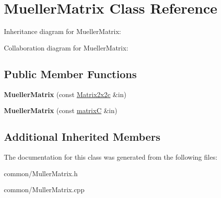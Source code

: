 \hypertarget{class_mueller_matrix}{}\section{Mueller\+Matrix Class Reference}
\label{class_mueller_matrix}


Inheritance diagram for Mueller\+Matrix\+:


Collaboration diagram for Mueller\+Matrix\+:
\subsection*{Public Member Functions}
\begin{DoxyCompactItemize}
\item 
\mbox{\label{class_mueller_matrix_a567e0f446f455f3eec493029c2983dbb}} 
{\bfseries Mueller\+Matrix} (const \mbox{\hyperlink{class_matrix2x2c}{Matrix2x2c}} \&in)
\item 
\mbox{\label{class_mueller_matrix_a13b75f898bb755242ef968cc7a680355}} 
{\bfseries Mueller\+Matrix} (const \mbox{\hyperlink{classmatrix_c}{matrixC}} \&in)
\end{DoxyCompactItemize}
\subsection*{Additional Inherited Members}


The documentation for this class was generated from the following files\+:\begin{DoxyCompactItemize}
\item 
common/Muller\+Matrix.\+h\item 
common/Muller\+Matrix.\+cpp\end{DoxyCompactItemize}

